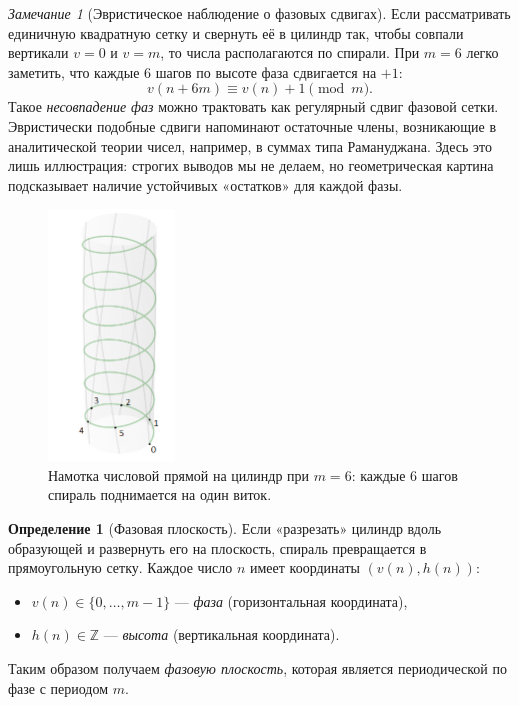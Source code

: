 \documentclass[12pt,a4paper]{article}
\newcommand{\Z}{\mathbb{Z}}
\theoremstyle{definition}
\newtheorem{definition}{Определение}[section]
\theoremstyle{plain}
\theoremstyle{remark}
\newtheorem*{remark}{Замечание}
\begin{document}
\begin{remark}[Эвристическое наблюдение о фазовых сдвигах]
Если рассматривать единичную квадратную сетку и свернуть её в цилиндр так,
чтобы совпали вертикали $v=0$ и $v=m$, то числа располагаются по спирали.
При $m=6$ легко заметить, что каждые $6$ шагов по высоте
фаза сдвигается на $+1$:
\[
v(n+6m)\equiv v(n)+1 \pmod m.
\]
Такое \emph{несовпадение фаз} можно трактовать как регулярный сдвиг фазовой сетки.
Эвристически подобные сдвиги напоминают остаточные члены, возникающие
в аналитической теории чисел, например, в суммах типа Рамануджана.
Здесь это лишь иллюстрация: строгих выводов мы не делаем, но геометрическая картина
подсказывает наличие устойчивых «остатков» для каждой фазы.
\end{remark}

\begin{figure}[H]
\centering
\includegraphics[width=0.3\textwidth]{phase_cylinder.png}
\caption{Намотка числовой прямой на цилиндр при $m=6$:
каждые $6$ шагов спираль поднимается на один виток.}
\label{fig:cylinder}
\end{figure}

\begin{definition}[Фазовая плоскость]\label{def:phase-plane}
Если «разрезать» цилиндр вдоль образующей и развернуть его на плоскость,
спираль превращается в прямоугольную сетку.
Каждое число $n$ имеет координаты $(v(n),h(n))$:
\begin{itemize}
  \item $v(n)\in\{0,\dots,m-1\}$ — \emph{фаза} (горизонтальная координата),
  \item $h(n)\in\Z$ — \emph{высота} (вертикальная координата).
\end{itemize}
Таким образом получаем \emph{фазовую плоскость}, которая является периодической
по фазе с периодом $m$.
\end{definition}
\end{document}
